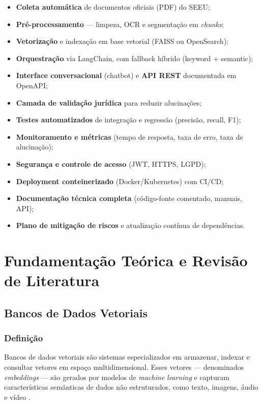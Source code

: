 \begin{itemize}[label=\textbullet]
  \item \textbf{Coleta automática} de documentos oficiais (PDF) do SEEU;
  \item \textbf{Pré-processamento} — limpeza, OCR e segmentação em \emph{chunks};
  \item \textbf{Vetorização} e indexação em base vetorial (FAISS ou OpenSearch);
  \item \textbf{Orquestração} via LangChain, com fallback híbrido (keyword + semantic);
  \item \textbf{Interface conversacional} (chatbot) e \textbf{API REST} documentada em OpenAPI;
  \item \textbf{Camada de validação jurídica} para reduzir alucinações;
  \item \textbf{Testes automatizados} de integração e regressão (precisão, recall, F1);
  \item \textbf{Monitoramento e métricas} (tempo de resposta, taxa de erro, taxa de alucinação);
  \item \textbf{Segurança e controle de acesso} (JWT, HTTPS, LGPD);
  \item \textbf{Deployment conteinerizado} (Docker/Kubernetes) com CI/CD;
  \item \textbf{Documentação técnica completa} (código-fonte comentado, manuais, API);
  \item \textbf{Plano de mitigação de riscos} e atualização contínua de dependências.
\end{itemize}




\chapter{Fundamentação Teórica e Revisão de Literatura}
\label{chap:fundamentacao_literatura}

\section{Bancos de Dados Vetoriais}
\label{sec:bancos-vetoriais}

\subsection{Definição}
Bancos de dados vetoriais são sistemas especializados em armazenar, indexar e
consultar vetores em espaço multidimensional. Esses vetores — denominados
\emph{embeddings} — são gerados por modelos de \emph{machine learning} e
capturam características semânticas de dados não estruturados, como texto,
imagens, áudio e vídeo \cite{qwak2024integrating}.

